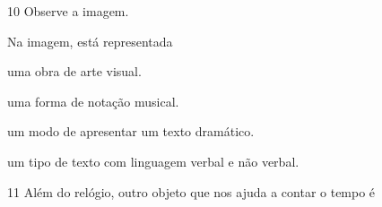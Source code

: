 \num{10}  Observe a imagem.


Na imagem, está representada

\begin{minipage}{.5\textwidth}
\begin{escolha}
\item uma obra de arte visual.
  
\item uma forma de notação musical.
  
\item um modo de apresentar um texto dramático.
  
\item um tipo de texto com linguagem verbal e não verbal.
  
\end{escolha}
\end{minipage}


\num{11}
Além do relógio, outro objeto que nos ajuda a contar o tempo é


